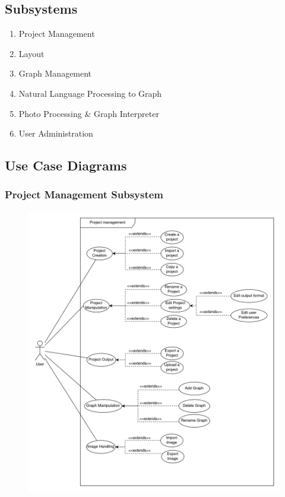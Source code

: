 \documentclass[11pt,a4paper]{article}
\begin{document}
\subsection*{Subsystems}
\begin{enumerate}
    \item Project Management
    \item Layout
    \item Graph Management
    \item Natural Language Processing to Graph
    \item Photo Processing \& Graph Interpreter
    \item User Administration
\end{enumerate}

\pagebreak

\subsection*{Use Case Diagrams}

\subsubsection*{Project Management Subsystem}
\begin{figure}[htbp]
    \centering
    \href{https://drive.google.com/drive/u/2/folders/18FJi5U-PEzTiB-SsYfPQOV304R0K7s3H}
    {\includegraphics[width=1\textwidth]{../diagramPng/Usecase Project-Subsystem.png}}
\end{figure}
\end{document}
